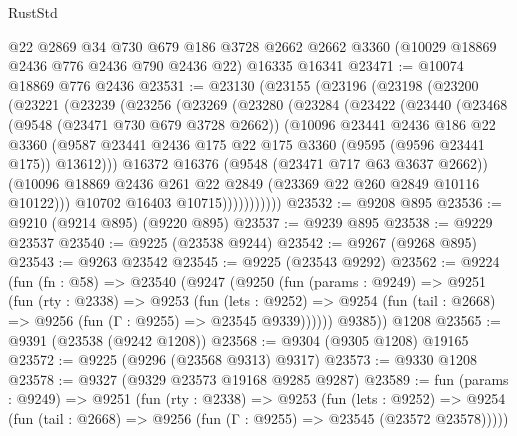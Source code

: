 \begin{lexlean}{RustStd}
\begin{coremodule}
    @22
    @2869
    @34
    @730
    @679
    @186
    @3728
    @2662
    @2662
    @3360
    (@10029 @18869 @2436 @776 @2436 @790 @2436 @22)
    @16335
    @16341
@23471 := @10074 @18869 @776 @2436
@23531 := @23130
    (@23155
      (@23196
        (@23198
          (@23200
            (@23221
              (@23239
                (@23256
                  (@23269
                    (@23280
                      (@23284
                        (@23422
                          (@23440
                            (@23468
                              (@9548 (@23471 @730 @679 @3728 @2662))
                              (@10096
                                @23441
                                @2436
                                @186
                                @22
                                @3360
                                (@9587
                                  @23441
                                  @2436
                                  @175
                                  @22
                                  @175
                                  @3360
                                  (@9595 (@9596 @23441 @175))
                                  @13612)))
                            @16372
                            @16376
                            (@9548 (@23471 @717 @63 @3637 @2662))
                            (@10096
                              @18869
                              @2436
                              @261
                              @22
                              @2849
                              (@23369 @22 @260 @2849 @10116 @10122)))
                          @10702
                          @16403
                          @10715)))))))))))
@23532 := @9208 @895
@23536 := @9210 (@9214 @895) (@9220 @895)
@23537 := @9239 @895
@23538 := @9229 @23537
@23540 := @9225 (@23538 @9244)
@23542 := @9267 (@9268 @895)
@23543 := @9263 @23542
@23545 := @9225 (@23543 @9292)
@23562 := @9224
    (fun (fn : @58) =>
    @23540
      (@9247
        (@9250
          (fun (params : @9249) =>
          @9251
            (fun (rty : @2338) =>
            @9253
              (fun (lets : @9252) =>
              @9254 (fun (tail : @2668) => @9256 (fun (Γ : @9255) => @23545 @9339))))))
        @9385))
    @1208
@23565 := @9391 (@23538 (@9242 @1208))
@23568 := @9304 (@9305 @1208) @19165
@23572 := @9225 (@9296 (@23568 @9313) @9317)
@23573 := @9330 @1208
@23578 := @9327 (@9329 @23573 @19168 @9285 @9287)
@23589 := fun (params : @9249) =>
  @9251
    (fun (rty : @2338) =>
    @9253
      (fun (lets : @9252) =>
      @9254 (fun (tail : @2668) => @9256 (fun (Γ : @9255) => @23545 (@23572 @23578)))))

\end{coremodule}
\end{lexlean}
